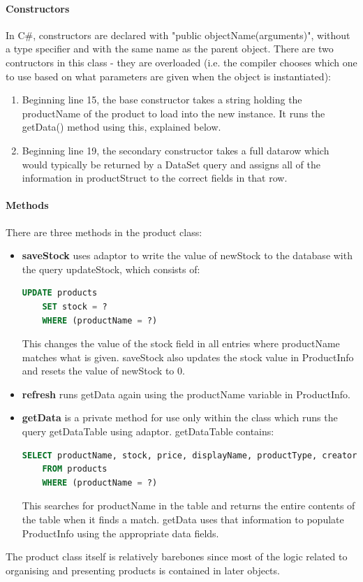 ﻿\documentclass{article}
\begin{document}
    \paragraph{Constructors}
    In C\#, constructors are declared with "public objectName(arguments)", without a type specifier and with the same name as the parent object.
    There are two contructors in this class - they are overloaded (i.e. the compiler chooses which one to use based on what parameters are given when the object is instantiated):
    \begin{enumerate}
        \item Beginning line 15, the base constructor takes a string holding the productName of the product to load into the new instance.
        It runs the getData() method using this, explained below.
        \item Beginning line 19, the secondary constructor takes a full datarow which would typically be returned by a DataSet query and assigns all of the information in productStruct to the correct fields in that row.
    \end{enumerate}
    \paragraph{Methods}
    There are three methods in the product class:
    \begin{itemize}
        \item \textbf{saveStock} uses adaptor to write the value of newStock to the database with the query updateStock, which consists of:
        \begin{lstlisting}[language=SQL]
    UPDATE products
    SET stock = ?
    WHERE (productName = ?)
        \end{lstlisting}
        This changes the value of the stock field in all entries where productName matches what is given.
        saveStock also updates the stock value in ProductInfo and resets the value of newStock to 0.
        \item \textbf{refresh} runs getData again using the productName variable in ProductInfo.
        \item \textbf{getData} is a private method for use only within the class which runs the query getDataTable using adaptor.
        getDataTable contains:
        \begin{lstlisting}[language=SQL]
    SELECT productName, stock, price, displayName, productType, creator, [image], [band], description
    FROM products
    WHERE (productName = ?)
        \end{lstlisting}
        This searches for productName in the table and returns the entire contents of the table when it finds a match.
        getData uses that information to populate ProductInfo using the appropriate data fields.
    \end{itemize}
    The product class itself is relatively barebones since most of the logic related to organising and presenting products is contained in later objects.
    \newpage
\end{document}
